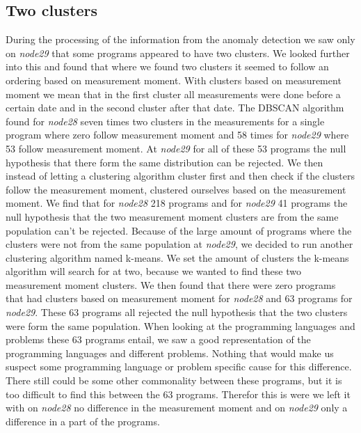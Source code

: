 \subsection{Two clusters}
During the processing of the information from the anomaly detection we saw only on \textit{node29} that some programs appeared to have two clusters. We looked further into this and found that where we found two clusters it seemed to follow an ordering based on measurement moment. With clusters based on measurement moment we mean that in the first cluster all measurements were done before a certain date and in the second cluster after that date. The DBSCAN algorithm found for \textit{node28} seven times two clusters in the measurements for a single program where zero follow measurement moment and 58 times for \textit{node29} where 53 follow measurement moment. At \textit{node29} for all of these 53 programs the null hypothesis that there form the same distribution can be rejected. We then instead of letting a clustering algorithm cluster first and then check if the clusters follow the measurement moment, clustered ourselves based on the measurement moment. We find that for \textit{node28} 218 programs and for \textit{node29} 41 programs the null hypothesis that the two measurement moment clusters are from the same population can't be rejected. Because of the large amount of programs where the clusters were not from the same population at \textit{node29}, we decided to run another clustering algorithm named k-means. We set the amount of clusters the k-means algorithm will search for at two, because we wanted to find these two measurement moment clusters. We then found that there were zero programs that had clusters based on measurement moment for \textit{node28} and 63 programs for \textit{node29}. These 63 programs all rejected the null hypothesis that the two clusters were form the same population. When looking at the programming languages and problems these 63 programs entail, we saw a good representation of the programming languages and different problems. Nothing that would make us suspect some programming language or problem specific cause for this difference. There still could be some other commonality between these programs, but it is too difficult to find this between the 63 programs. Therefor this is were we left it with on \textit{node28} no difference in the measurement moment and on \textit{node29} only a difference in a part of the programs.


